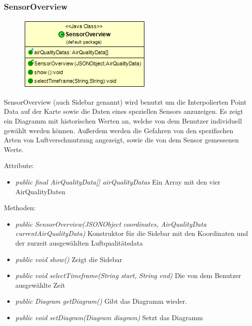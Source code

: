 \subsubsection{SensorOverview}
\begin{minipage}{0.3\textwidth}
    \begin{figure}[H]
        {\centering\includegraphics[scale = 0.5
        ]{media/view/map/SensorOverview_Class.png}}
    \end{figure}
    \end{minipage} \hfill
    \begin{minipage}{0.6\textwidth}
SensorOverview (auch Sidebar genannt) wird benutzt um die Interpolierten Point Data auf der Karte sowie die Daten eines speziellen Sensors anzuzeigen. Es zeigt ein Diagramm mit historischen Werten an, welche von dem Benutzer individuell gewählt werden können. Außerdem werden die Gefahren von den spezifischen Arten von Luftverschmutzung angezeigt, sowie die von dem Sensor gemessenen Werte.
\end{minipage}
Attribute: \begin{itemize} [noitemsep]
    \item \emph{public final AirQualityData[] airQualityDatas} Ein Array mit den vier AirQualityDaten
\end{itemize}
Methoden: \begin{itemize} [noitemsep]
    
    \item \emph{public SensorOverview(JSONObject coordinates, AirQualityData currentAirQualityData)} Konstruktor für die Sidebar mit den Koordinaten und der zurzeit ausgewählten Luftqualitätsdata
    \item \emph{public void show()} Zeigt die Sidebar
    \item \emph{public void selectTimeframe(String start, String end)} Die von dem Benutzer ausgewählte Zeit
    \item \emph{public Diagram getDiagram()} Gibt das Diagramm wieder.
    \item \emph{public void setDiagram(Diagram diagram)} Setzt das Diagramm
\end{itemize}

